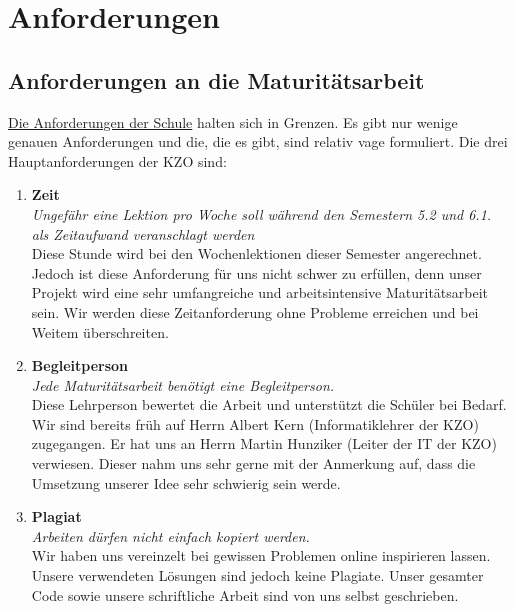 \chapter{Anforderungen}

\section{Anforderungen an die Maturitätsarbeit}
\href{https://www.kzo.ch/fileadmin/internet/pdf_internet/Unterricht/Maturjahr/Reglement_Maturitaetsarbeit_2023.pdf}{Die Anforderungen der Schule} halten sich in Grenzen. Es gibt nur wenige genauen Anforderungen
und die, die es gibt, sind relativ vage formuliert. Die drei Hauptanforderungen der KZO sind:
\begin{enumerate}
    \item \textbf{Zeit} \\
        \textit{Ungefähr eine Lektion pro Woche soll während den Semestern 5.2 und 6.1. als Zeitaufwand veranschlagt werden}\\Diese Stunde wird bei den Wochenlektionen dieser Semester angerechnet.
        Jedoch ist diese Anforderung für uns nicht schwer zu erfüllen, denn unser Projekt wird eine sehr umfangreiche und arbeitsintensive Maturitätsarbeit sein.
        Wir werden diese Zeitanforderung ohne Probleme erreichen und bei Weitem überschreiten.
    \item \textbf{Begleitperson} \\
        \textit{Jede Maturitätsarbeit benötigt eine Begleitperson. }\\Diese Lehrperson bewertet die Arbeit und unterstützt die Schüler bei Bedarf.
        Wir sind bereits früh auf Herrn Albert Kern (Informatiklehrer der KZO) zugegangen.
        Er hat uns an Herrn Martin Hunziker (Leiter der IT der KZO) verwiesen. Dieser nahm uns sehr gerne mit der Anmerkung auf, dass die Umsetzung unserer Idee sehr schwierig sein werde.
    \item \textbf{Plagiat} \\
        \textit{Arbeiten dürfen nicht einfach kopiert werden. }\\Wir haben uns vereinzelt bei gewissen Problemen online inspirieren lassen. Unsere verwendeten Lösungen sind jedoch keine Plagiate.
        Unser gesamter Code sowie unsere schriftliche Arbeit sind von uns selbst geschrieben.
\end{enumerate}

